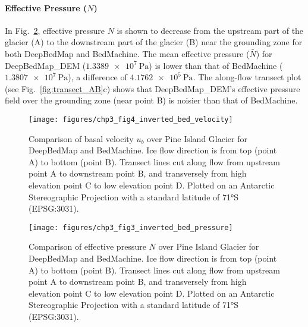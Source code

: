 \paragraph{Effective Pressure ($N$)}

In Fig.~\ref{fig:effective_pressure}, effective pressure $N$ is shown to decrease from the upstream part of the glacier (A) to the downstream part of the glacier (B) near the grounding zone for both DeepBedMap and BedMachine.
The mean effective pressure ($\bar{N}$) for DeepBedMap\_DEM ($\SI{1.3389e7}{\pascal}$) is lower than that of BedMachine ($\SI{1.3807e7}{\pascal}$), a difference of $\SI{4.1762e5}{\pascal}$.
The along-flow transect plot (see Fig.~\ref{fig:transect_AB}c) shows that DeepBedMap\_DEM's effective pressure field over the grounding zone (near point B) is noisier than that of BedMachine.

\begin{landscape}
\begin{figure}[htbp]
  \texttt{[image: figures/chp3\_fig4\_inverted\_bed\_velocity]}
  \caption[Comparison of basal velocity over Pine Island Glacier for DeepBedMap and BedMachine]{
    Comparison of basal velocity $u_b$ over Pine Island Glacier for DeepBedMap and BedMachine.
    Ice flow direction is from top (point A) to bottom (point B).
    Transect lines cut along flow from upstream point A to downstream point B, and transversely from high elevation point C to low elevation point D.
    Plotted on an Antarctic Stereographic Projection with a standard latitude of 71°S (EPSG:3031).
  }
  \label{fig:velocity}
\end{figure}
\end{landscape}

\begin{landscape}
\begin{figure}[htbp]
  \texttt{[image: figures/chp3\_fig3\_inverted\_bed\_pressure]}
  \caption[Comparison of effective pressure over Pine Island Glacier for DeepBedMap and BedMachine]{
    Comparison of effective pressure $N$ over Pine Island Glacier for DeepBedMap and BedMachine.
    Ice flow direction is from top (point A) to bottom (point B).
    Transect lines cut along flow from upstream point A to downstream point B, and transversely from high elevation point C to low elevation point D.
    Plotted on an Antarctic Stereographic Projection with a standard latitude of 71°S (EPSG:3031).
  }
  \label{fig:effective_pressure}
\end{figure}
\end{landscape}

